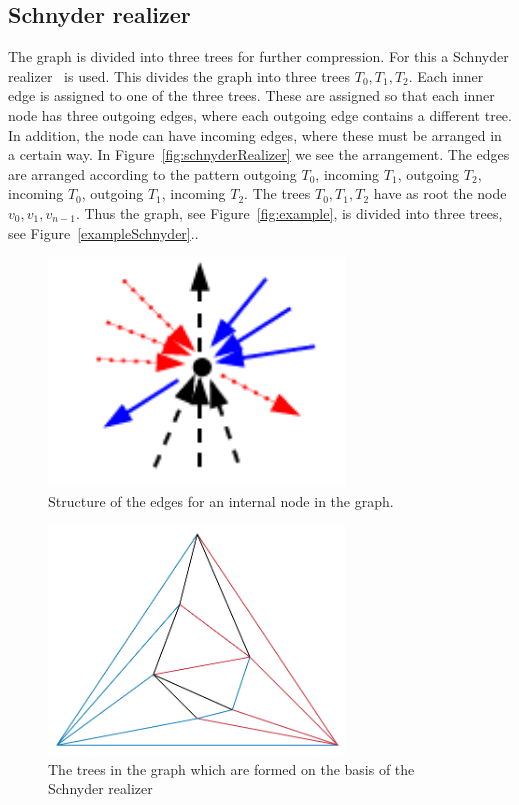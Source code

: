 \documentclass[a4paper]{scrartcl}
\begin{document}
\subsection{Schnyder realizer}
The graph is divided into three trees for further compression. For this a Schnyder realizer~\cite{schnyder} is used. This divides the graph into three trees $T_0,T_1,T_2$. Each inner edge is assigned to one of the three trees. These are assigned so that each inner node has three outgoing edges, where each outgoing edge contains a different tree.  In addition, the node can have incoming edges, where these must be arranged in a certain way. In Figure~\ref{fig:schnyderRealizer} we see the arrangement. The edges are arranged according to the pattern outgoing $T_0$, incoming $T_1$, outgoing $T_2$, incoming $T_0$, outgoing $T_1$, incoming $T_2$. The trees $T_0,T_1,T_2$ have as root the node $v_0,v_1,v_{n-1}$.
Thus the graph, see Figure~\ref{fig:example}, is divided into three trees, see Figure~\ref{exampleSchnyder}..
\begin{figure}[h]
	\centering
	\includegraphics[width=0.7\textwidth]{img/schnyderRealizer}
	\caption{Structure of the edges for an internal node in the graph. }
	\label{fig:schnyderrealizer}
\end{figure}



\begin{figure}[h]
	\centering
	\includegraphics[width=0.7\textwidth]{img/exampleSchnyder}
	\caption{The trees in the graph which are formed on the basis of the Schnyder realizer}
	\label{fig:exampleSchnyder}
\end{figure}
\end{document}
